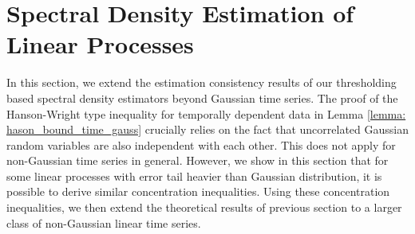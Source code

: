 \section{Spectral Density Estimation of Linear Processes}\label{sec:heavy-tail} %

In this section, we extend the estimation consistency results of our thresholding based spectral density estimators beyond Gaussian time series. The proof of the Hanson-Wright type inequality for temporally dependent data in Lemma \ref{lemma: hason_bound_time_gauss} crucially relies on the fact that uncorrelated Gaussian random  variables are also independent with each other. This does not apply for non-Gaussian time series in general. However, we show in this section that for some linear processes with error tail heavier than Gaussian distribution, it is possible to derive similar concentration inequalities. Using these concentration inequalities, we then extend the theoretical results of previous section to a larger class of non-Gaussian linear time series.

